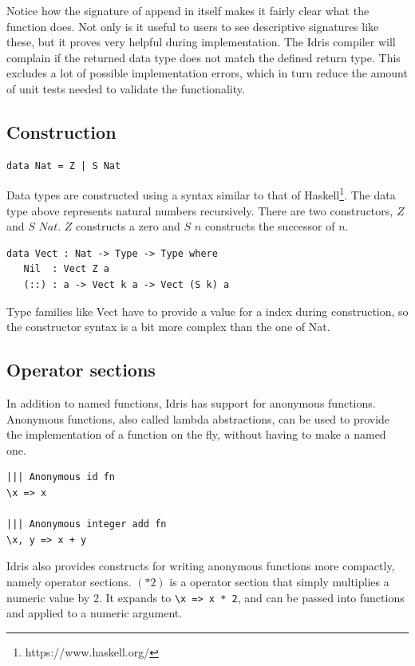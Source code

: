 \documentclass[12pt]{article}
\begin{document}
Notice how the signature of append in itself makes it fairly clear what the function does.
Not only is it useful to users to see descriptive signatures like these, but it proves very helpful during implementation.
The Idris compiler will complain if the returned data type does not match the defined return type.
This excludes a lot of possible implementation errors, which in turn reduce the amount of unit tests needed to validate the functionality.

\subsection{Construction}

\begin{lstlisting}
data Nat = Z | S Nat 
\end{lstlisting}

Data types are constructed using a syntax similar to that of Haskell\footnote{https://www.haskell.org/}.
The data type above represents natural numbers recursively.
There are two constructors, $Z$ and $S$ $Nat$.
$Z$ constructs a zero and $S$ $n$ constructs the successor of $n$.

\begin{lstlisting}
data Vect : Nat -> Type -> Type where
   Nil  : Vect Z a
   (::) : a -> Vect k a -> Vect (S k) a
\end{lstlisting}

Type families like Vect have to provide a value for a index during construction, so the constructor syntax is a bit more complex than the one of Nat.

\subsection{Operator sections}

In addition to named functions, Idris has support for anonymous functions.
Anonymous functions, also called lambda abstractions, can be used to provide the implementation of a function on the fly, without having to make a named one.

\begin{lstlisting}
||| Anonymous id fn
\x => x

||| Anonymous integer add fn
\x, y => x + y

\end{lstlisting}

Idris also provides constructs for writing anonymous functions more compactly, namely operator sections.
$(*2)$ is a operator section that simply multiplies a numeric value by 2.
It expands to \lstinline{\x => x * 2}, and can be passed into functions and applied to a numeric argument.
\end{document}
